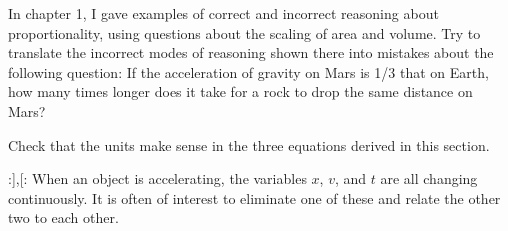 



\startdqs

\begin{dq}
In chapter 1, I gave examples of correct and incorrect
reasoning about proportionality, using questions about the
scaling of area and volume. Try to translate the incorrect
modes of reasoning shown there into mistakes about the
following question: If the acceleration of gravity on Mars
is 1/3 that on Earth, how many times longer does it take for
a rock to drop the same distance on Mars?
\end{dq}

\begin{dq} Check that the units make sense in the three equations
derived in this section.
\end{dq}
:],[:%
When an object is accelerating, the variables $x$, $v$, and $t$ are all changing continuously.
It is often of interest to eliminate one of these and relate the other two to each other.

